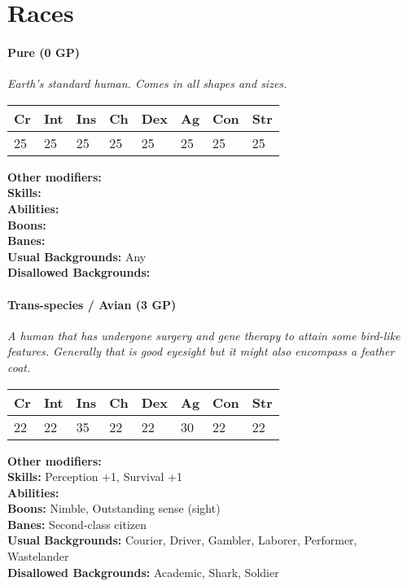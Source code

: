 \section{Races}
\label{sec:racelist}
\paragraph*{Pure (0 GP)}
\textit{Earth's standard human. Comes in all shapes and sizes.}\par
\begin{tabular}{|l|l|l|l|l|l|l|l|}
	\hline
	Cr & Int & Ins & Ch & Dex & Ag & Con & Str \\ \hline
	25 & 25 & 25 & 25 & 25 & 25 & 25 & 25 \\ \hline
\end{tabular}\par
\noindent\textbf{Other modifiers:} \\
\textbf{Skills:} \\
\textbf{Abilities:} \\
\textbf{Boons:} \\
\textbf{Banes:} \\
\textbf{Usual Backgrounds:} Any\\
\textbf{Disallowed Backgrounds:} 

\hrulefill
\paragraph*{Trans-species / Avian (3 GP)}
\textit{A human that has undergone surgery and gene therapy to attain some bird-like features. Generally that is good eyesight but it might also encompass a feather coat.}\par
\begin{tabular}{|l|l|l|l|l|l|l|l|}
	\hline
	Cr & Int & Ins & Ch & Dex & Ag & Con & Str \\ \hline
	22 & 22 & 35 & 22 & 22 & 30 & 22 & 22 \\ \hline
\end{tabular}\par
\noindent\textbf{Other modifiers:} \\
\textbf{Skills:} Perception +1,	Survival +1\\
\textbf{Abilities:} \\
\textbf{Boons:} Nimble,	Outstanding sense (sight)\\
\textbf{Banes:} Second-class citizen\\
\textbf{Usual Backgrounds:} Courier, Driver, Gambler, Laborer, Performer, Wastelander\\
\textbf{Disallowed Backgrounds:} Academic, Shark, Soldier

